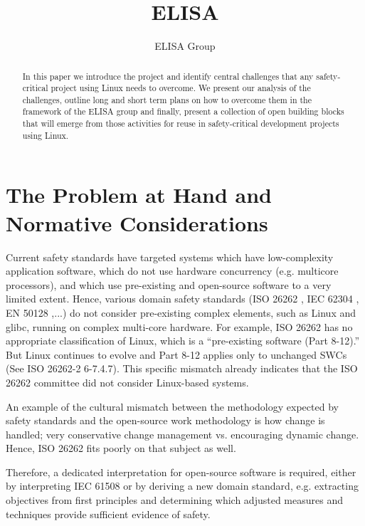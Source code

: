 \documentclass[12pt]{ElisaPaper}
\title{ELISA}
\author{ELISA Group}
\begin{document}
	
\maketitle	
\begin{abstract}
In this paper we introduce the project and identify central challenges that any safety-critical project using Linux needs to overcome.
We present our analysis of the challenges, outline long and short term plans on how to overcome them in the framework of the ELISA group and finally, present a collection of open building blocks that will emerge from those activities for reuse in safety-critical development projects using Linux.
\end{abstract}

\tableofcontents

\section{The Problem at Hand and Normative Considerations}
Current safety standards have targeted systems which have low-complexity application software, which do not use hardware concurrency (e.g. multicore processors), and which use pre-existing and open-source software to a very limited extent. 
Hence, various domain safety standards (ISO 26262 \cite{ISO26262:2018}, IEC 62304 \cite{IEC62304}, EN 50128 \cite{DINEN50128},...) do not consider pre-existing complex elements, such as Linux and glibc, running on complex multi-core hardware. 
For example, ISO 26262 has no appropriate classification of Linux, which is a “pre-existing software  (Part 8-12).” 
But Linux continues to evolve and Part 8-12 applies only to unchanged SWCs (See ISO 26262-2 6-7.4.7). 
This specific mismatch already indicates that the ISO 26262 committee did not consider Linux-based systems.

An example of the cultural mismatch between the methodology expected by safety standards and the open-source work methodology is how change is handled; very conservative change management vs. encouraging dynamic change.
Hence, ISO 26262 fits poorly on that subject as well.

Therefore, a dedicated interpretation for open-source software is required, either by interpreting IEC 61508 or by deriving a new domain standard, e.g. extracting objectives from first principles and determining which adjusted measures and techniques provide sufficient evidence of safety.
\end{document}
